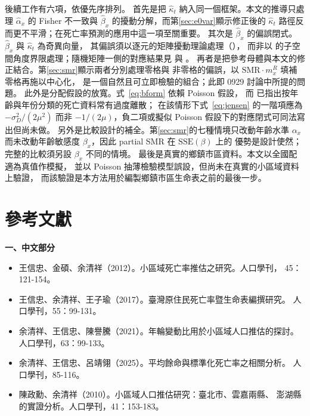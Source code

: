 \documentclass[UTF8, fontset=macnew, a4paper, 12pt]{ctexart}
\begin{document}
後續工作有六項，依優先序排列。
首先是把 $\hat\kappa_t$ 納入同一個框架。本文的推導只處理 $\hat\alpha_x$ 的
Fisher 不一致與 $\hat\beta_x$ 的擾動分解，而第\ref{sec:e0var}顯示修正後的
$\hat\kappa_t$ 路徑反而更不平滑；在死亡率預測的應用中這一項至關重要。
其次是 $\hat\beta_x$ 的偏誤閉式。$\hat\beta_x$ 與 $\hat\kappa_t$ 為奇異向量，
其偏誤須以逐元的矩陣擾動理論處理（\citealp{abbe2020}），
而非以 \citet{caizhang2018} 的子空間角度界限處理；隨機矩陣一側的對應結果見 \citet{benaych2012} 與 \citet{zhang2022}。
再者是把參考母體與本文的修正結合。第\ref{sec:smr}顯示兩者分別處理零格與
非零格的偏誤，以 $\mathrm{SMR}\cdot m^{R}_x$ 填補零格再施以中心化，
是一個自然且可立即檢驗的組合；此即 0929 討論中所提的問題。
此外是分配假設的放寬。式~\eqref{eq:bform} 依賴 Poisson 假設，
而 \citet{djeundje2010}已指出按年齡與年份分類的死亡資料常有過度離散；
在該情形下式~\eqref{eq:jensen} 的一階項應為 $-\sigma_D^2/(2\mu^2)$
而非 $-1/(2\mu)$，負二項或擬似 Poisson 假設下的對應閉式可同法寫出但尚未做。
另外是比較設計的補全。第\ref{sec:smr}的七種情境只改動年齡水準 $\alpha_x$
而未改動年齡敏感度 $\beta_x$，因此 partial SMR 在 $\mathrm{SSE}(\beta)$ 上的
優勢是設計使然；完整的比較須另設 $\beta_x$ 不同的情境。
最後是真實的鄉鎮市區資料。本文以全國配適為真值作模擬，
並以 Poisson 抽薄檢驗模型誤設，但尚未在真實的小區域資料上驗證，
而該驗證是本方法用於編製鄉鎮市區生命表之前的最後一步。


\section*{參考文獻}

\noindent\textbf{一、中文部分}
\begin{itemize}[leftmargin=2em, label={}, itemsep=3pt]
  \item[] 王信忠、金碩、余清祥（2012）。小區域死亡率推估之研究。人口學刊，
        45：121-154。
  \item[] 王信忠、余清祥、王子瑜（2017）。臺灣原住民死亡率暨生命表編撰研究。
        人口學刊，55：99-131。
  \item[] 余清祥、王信忠、陳譽騰（2021）。年輪變動比用於小區域人口推估的探討。
        人口學刊，63：99-133。
  \item[] 余清祥、王信忠、呂靖翎（2025）。平均餘命與標準化死亡率之相關分析。
        人口學刊，85-116。
  \item[] 陳政勳、余清祥（2010）。小區域人口推估研究：臺北市、雲嘉兩縣、
        澎湖縣的實證分析。人口學刊，41：153-183。
\end{itemize}

\renewcommand{\bibsection}{\vspace{8pt}\noindent\textbf{二、英文部分}\par\vspace{4pt}}
\setlength{\bibsep}{2pt}


\end{document}

